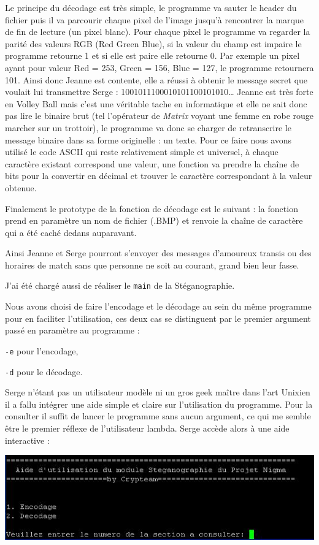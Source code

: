 \documentclass[a4paper,12pt]{article}
\begin{document}
Le principe du décodage est très simple, le programme va sauter le header du fichier puis il va parcourir chaque pixel de l'image jusqu'à rencontrer la marque de fin de lecture (un pixel blanc). Pour chaque pixel le programme va regarder la parité des valeurs RGB (Red Green Blue), si la valeur du champ est impaire le programme retourne 1 et si elle est paire elle retourne 0. Par exemple un pixel ayant pour valeur Red = 253, Green = 156, Blue = 127, le programme retournera 101. Ainsi donc Jeanne est contente, elle a réussi à obtenir le message secret que voulait lui transmettre Serge : 1001011100010101100101010\dots{} Jeanne est très forte en Volley Ball mais c'est une véritable tache en informatique et elle ne sait donc pas lire le binaire brut (tel l'opérateur de \emph{Matrix} voyant une femme en robe rouge marcher sur un trottoir), le programme va donc se charger de retranscrire le message binaire dans sa forme originelle : un texte. Pour ce faire nous avons utilisé le code ASCII qui reste relativement simple et universel, à chaque caractère existant correspond une valeur, une fonction va prendre la chaîne de bits pour la convertir en décimal et trouver le caractère correspondant à la valeur obtenue.

Finalement le prototype de la fonction de décodage est le suivant : la fonction prend en paramètre un nom de fichier (.BMP) et renvoie la chaîne de caractère qui a été caché dedans auparavant.

Ainsi Jeanne et Serge pourront s'envoyer des messages d'amoureux transis ou des horaires de match sans que personne ne soit au courant, grand bien leur fasse.

J'ai été chargé aussi de réaliser le \texttt{main} de la Stéganographie.

Nous avons choisi de faire l'encodage et le décodage au sein du même programme pour en faciliter l'utilisation, ces deux cas se distinguent par le premier argument passé en paramètre au programme :

\texttt{-e} pour l'encodage,

\texttt{-d} pour le décodage.

Serge n'étant pas un utilisateur modèle ni un gros geek maître dans l'art Unixien il a fallu intégrer une aide simple et claire sur l'utilisation du programme. Pour la consulter il suffit de lancer le programme sans aucun argument, ce qui me semble être le premier réflexe de l'utilisateur lambda. Serge accède alors à une aide interactive :

\begin{center}	
  \includegraphics[scale=0.75]{aide1.JPG}
\end{center}
\end{document}
